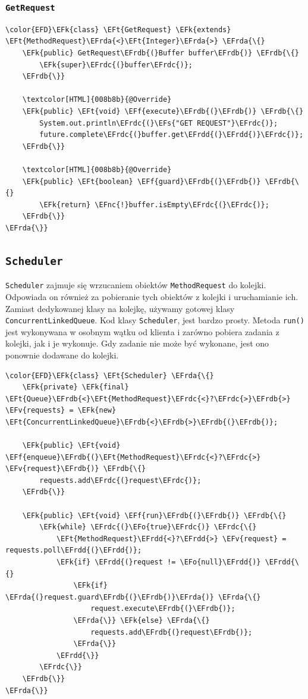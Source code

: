 \documentclass[11pt]{article}
\newcommand{\EFs}[1]{\textcolor{EFs}{#1}} %
\newcommand{\EFk}[1]{\textcolor{EFk}{#1}} %
\newcommand{\EFf}[1]{\textcolor{EFf}{#1}} %
\newcommand{\EFv}[1]{\textcolor{EFv}{#1}} %
\newcommand{\EFt}[1]{\textcolor{EFt}{#1}} %
\newcommand{\EFo}[1]{\textcolor{EFo}{#1}} %
\newcommand{\EFnc}[1]{#1} %
\newcommand{\EFrda}[1]{\textcolor{EFrda}{#1}} %
\newcommand{\EFrdb}[1]{\textcolor{EFrdb}{#1}} %
\newcommand{\EFrdc}[1]{\textcolor{EFrdc}{#1}} %
\newcommand{\EFrdd}[1]{\textcolor{EFrdd}{#1}} %
\begin{document}
\subsubsection*{\texttt{GetRequest}}
\label{sec:org0b1a5c4}
\begin{Code}
\begin{Verbatim}
\color{EFD}\EFk{class} \EFt{GetRequest} \EFk{extends} \EFt{MethodRequest}\EFrda{<}\EFt{Integer}\EFrda{>} \EFrda{\{}
    \EFk{public} GetRequest\EFrdb{(}Buffer buffer\EFrdb{)} \EFrdb{\{}
        \EFk{super}\EFrdc{(}buffer\EFrdc{)};
    \EFrdb{\}}

    \textcolor[HTML]{008b8b}{@Override}
    \EFk{public} \EFt{void} \EFf{execute}\EFrdb{(}\EFrdb{)} \EFrdb{\{}
        System.out.println\EFrdc{(}\EFs{"GET REQUEST"}\EFrdc{)};
        future.complete\EFrdc{(}buffer.get\EFrdd{(}\EFrdd{)}\EFrdc{)};
    \EFrdb{\}}

    \textcolor[HTML]{008b8b}{@Override}
    \EFk{public} \EFt{boolean} \EFf{guard}\EFrdb{(}\EFrdb{)} \EFrdb{\{}
        \EFk{return} \EFnc{!}buffer.isEmpty\EFrdc{(}\EFrdc{)};
    \EFrdb{\}}
\EFrda{\}}
\end{Verbatim}
\end{Code}
\subsection*{\texttt{Scheduler}}
\label{sec:orgd0a6c77}
\texttt{Scheduler} zajmuje się wrzucaniem obiektów \texttt{MethodRequest} do kolejki.
Odpowiada on również za pobieranie tych obiektów z kolejki i uruchamianie ich.
Zamiast dedykowanej klasy na kolejkę, używamy gotowej klasy \texttt{ConcurrentLinkedQueue}.
Kod klasy \texttt{Scheduler}, jest bardzo prosty. Metoda \texttt{run()} jest wykonywana
w osobnym wątku od klienta i zarówno pobiera zadania z kolejki, jak i je wykonuje.
Gdy zadanie nie może być wykonane, jest ono ponownie dodawane do kolejki.


\begin{Code}
\begin{Verbatim}
\color{EFD}\EFk{class} \EFt{Scheduler} \EFrda{\{}
    \EFk{private} \EFk{final} \EFt{Queue}\EFrdb{<}\EFt{MethodRequest}\EFrdc{<}?\EFrdc{>}\EFrdb{>} \EFv{requests} = \EFk{new} \EFt{ConcurrentLinkedQueue}\EFrdb{<}\EFrdb{>}\EFrdb{(}\EFrdb{)};

    \EFk{public} \EFt{void} \EFf{enqueue}\EFrdb{(}\EFt{MethodRequest}\EFrdc{<}?\EFrdc{>} \EFv{request}\EFrdb{)} \EFrdb{\{}
        requests.add\EFrdc{(}request\EFrdc{)};
    \EFrdb{\}}

    \EFk{public} \EFt{void} \EFf{run}\EFrdb{(}\EFrdb{)} \EFrdb{\{}
        \EFk{while} \EFrdc{(}\EFo{true}\EFrdc{)} \EFrdc{\{}
            \EFt{MethodRequest}\EFrdd{<}?\EFrdd{>} \EFv{request} = requests.poll\EFrdd{(}\EFrdd{)};
            \EFk{if} \EFrdd{(}request != \EFo{null}\EFrdd{)} \EFrdd{\{}
                \EFk{if} \EFrda{(}request.guard\EFrdb{(}\EFrdb{)}\EFrda{)} \EFrda{\{}
                    request.execute\EFrdb{(}\EFrdb{)};
                \EFrda{\}} \EFk{else} \EFrda{\{}
                    requests.add\EFrdb{(}request\EFrdb{)};
                \EFrda{\}}
            \EFrdd{\}}
        \EFrdc{\}}
    \EFrdb{\}}
\EFrda{\}}
\end{Verbatim}
\end{Code}
\end{document}
